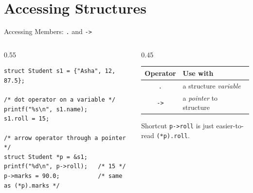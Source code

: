 \documentclass[aspectratio=169]{beamer}
\begin{document}
	\section{Accessing Structures}
	\begin{frame}[fragile]{Accessing Members: \texttt{.} and \texttt{->}}
		\begin{columns}[T]
			\begin{column}{0.55\textwidth}
				\begin{lstlisting}
struct Student s1 = {"Asha", 12, 87.5};

/* dot operator on a variable */
printf("%s\n", s1.name);
s1.roll = 15;

/* arrow operator through a pointer */
struct Student *p = &s1;
printf("%d\n", p->roll);   /* 15 */
p->marks = 90.0;           /* same as (*p).marks */
				\end{lstlisting}
			\end{column}
			\begin{column}{0.45\textwidth}
				\renewcommand{\arraystretch}{1.3}
				\centering
				\begin{tabular}{@{}cl@{}}
					\toprule
					\textbf{Operator} & \textbf{Use with} \\
					\midrule
					\texttt{.}  & a structure \emph{variable} \\
					\texttt{->} & a \emph{pointer} to structure \\
					\bottomrule
				\end{tabular}
				\vspace{0.2cm}
				\begin{block}{Shortcut}
					\small \texttt{p->roll} is just easier-to-read \texttt{(*p).roll}.
				\end{block}
			\end{column}
		\end{columns}
	\end{frame}

\end{document}
